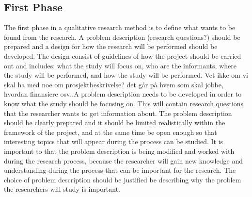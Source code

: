 \subsection{First Phase} 
The first phase in a qualitative research method is to define what wants to be found from the research. A problem description (research questions?) should be prepared and a design for how the research will be performed should be developed. The design consist of guidelines of how the project should be carried out and includes: what the study will focus on, who are the informants, where the study will be performed, and how the study will be performed. Vet ikke om vi skal ha med noe om prosjektbeskrivelse? det går på hvem som skal jobbe, hvordan finansiere osv..A problem description needs to be developed in order to know what the study should be focusing on. This will contain research questions that the researcher wants to get information about. The problem description should be clearly prepared and it should be limited realistically within the framework of the project, and at the same time be open enough so that interesting topics that will appear during the process can be studied. It is important to that the problem description is being modified and worked with during the research process, because the researcher will gain new knowledge and understanding during the process that can be important for the research. The choice of problem description should be justified be describing why the problem the researchers will study is important. 
